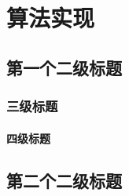 \chapter{算法实现}
    \section{第一个二级标题}
        \subsection{三级标题}
            \subsubsection{四级标题}
    \section{第二个二级标题}